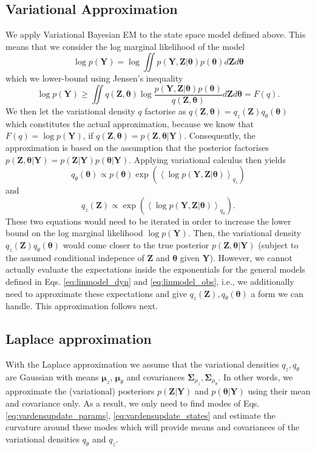 \documentclass[a4paper,10pt]{article}
\newcommand{\bs}[1]{\mathbf{#1}}					%
\newcommand{\bgs}[1]{\boldsymbol{#1}}				%
\newcommand{\eq}[1]{\begin{equation} #1 \end{equation}}%
\renewcommand{\ss}{z}         %
\newcommand{\spm}{\mu}    %
\renewcommand{\sp}{\theta}    %
\newcommand{\ppm}{\bgs{\spm}}   %
\newcommand{\pp}{\bgs{\sp}} %
\newcommand{\Ps}{\bs{Z}}    %
\newcommand{\Po}{\bs{Y}}    %
\newcommand{\E}[2][]{\left\langle #2 \right\rangle_{#1}}	%
\newcommand{\Cov}{\bgs{\Sigma}}			%
\begin{document}
\subsection{Variational Approximation}
We apply Variational Bayesian EM \cite{Beal2003} to the state space model defined above. This means that we consider the log marginal likelihood of the model
\eq{
    \log p(\Po) = \log \iint p(\Po,\Ps|\pp)p(\pp) d\Ps d\pp
}
which we lower-bound using Jensen's inequality
\eq{
    \log p(\Po) \geq \iint q(\Ps, \pp)\log \frac{p(\Po,\Ps|\pp)p(\pp)}{q(\Ps, \pp)} d\Ps d\pp = F(q).
}
We then let the variational density $q$ factorise as $q(\Ps, \pp) = q_{\ss}(\Ps)q_{\sp}(\pp)$ which constitutes the actual approximation, because we know that $F(q) = \log p(\Po)$, if $q(\Ps, \pp) = p(\Ps,\pp|\Po)$. Consequently, the approximation is based on the assumption that the posterior factorises $p(\Ps,\pp|\Po) = p(\Ps|\Po) p(\pp|\Po)$. Applying variational calculus then yields
\eq{\label{eq:vardensupdate_params}
    q_{\sp}(\pp) \propto p(\pp)\exp\left(\E[q_\ss]{\log p(\Po,\Ps|\pp)}\right)
}
and
\eq{\label{eq:vardensupdate_states}
    q_{\ss}(\Ps) \propto \exp\left(\E[q_\sp]{\log p(\Po,\Ps|\pp)}\right).
}
These two equations would need to be iterated in order to increase the lower bound on the log marginal likelihood $\log p(\Po)$. Then, the variational density $q_{\ss}(\Ps)q_{\sp}(\pp)$ would come closer to the true posterior $p(\Ps,\pp|\Po)$ (subject to the assumed conditional indepence of $\Ps$ and $\pp$ given $\Po$). However, we cannot actually evaluate the expectations inside the exponentials for the general models defined in Eqs. \ref{eq:linmodel_dyn} and \ref{eq:linmodel_obs}, i.e., we additionally need to approximate these expectations and give $q_{\ss}(\Ps), q_{\sp}(\pp)$ a form we can handle. This approximation follows next.


\subsection{Laplace approximation}
With the Laplace approximation we assume that the variational densities $q_{\ss}, q_{\sp}$ are Gaussian with means $\ppm_{\ss}$, $\ppm_{\sp}$ and covariances $\Cov_{\spm_\ss}, \Cov_{\spm_\sp}$. In other words, we approximate the (variational) posteriors $p(\Ps|\Po)$ and $p(\pp|\Po)$ using their mean and covariance only. As a result, we only need to find modes of Eqs. \ref{eq:vardensupdate_params}, \ref{eq:vardensupdate_states} and estimate the curvature around these modes which will provide means and covariances of the variational densities $q_\sp$ and $q_\ss$.
\end{document}
